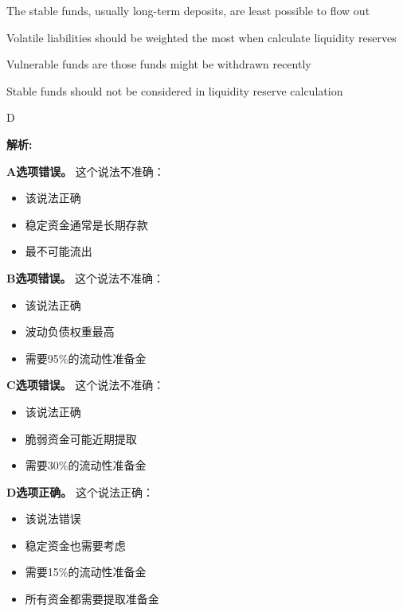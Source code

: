 \documentclass{article}
\newenvironment{explanation}
{\textbf{解析:}\par}
{\par}
\begin{document}
\begin{choices}
    \item The stable funds, usually long-term deposits, are least possible to flow out
    \item Volatile liabilities should be weighted the most when calculate liquidity reserves
    \item Vulnerable funds are those funds might be withdrawn recently
    \item Stable funds should not be considered in liquidity reserve calculation
\end{choices}

\begin{correctanswer}
    D
\end{correctanswer}

\begin{explanation}
    \textbf{A选项错误。}
    这个说法不准确：
    \begin{itemize}
        \item 该说法正确
        \item 稳定资金通常是长期存款
        \item 最不可能流出
    \end{itemize}

    \textbf{B选项错误。}
    这个说法不准确：
    \begin{itemize}
        \item 该说法正确
        \item 波动负债权重最高
        \item 需要95\%的流动性准备金
    \end{itemize}

    \textbf{C选项错误。}
    这个说法不准确：
    \begin{itemize}
        \item 该说法正确
        \item 脆弱资金可能近期提取
        \item 需要30\%的流动性准备金
    \end{itemize}

    \textbf{D选项正确。}
    这个说法正确：
    \begin{itemize}
        \item 该说法错误
        \item 稳定资金也需要考虑
        \item 需要15\%的流动性准备金
        \item 所有资金都需要提取准备金
    \end{itemize}
\end{explanation}
\end{document}
